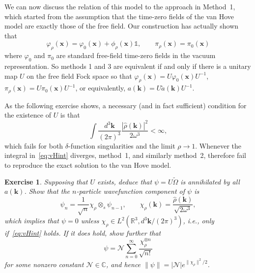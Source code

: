 \documentclass[12pt,a4paper]{article}
\newcommand{\1}{\mathds{1}}                         %
\newcommand{\RR}{\mathbb{R}}           %
\newcommand{\CC}{\mathbb{C}}           %
\newcommand{\kb}{{\boldsymbol{k}}}
\newcommand{\xb}{{\boldsymbol{x}}}
\newtheorem{exercise}[theorem]{Exercise}
\begin{document}
	We can now discuss the relation of this model to the approach in Method~1,
	which started from the assumption that the time-zero fields of the van Hove model are exactly those of the free field. Our construction has actually shown that
	\begin{equation}
	\varphi_\rho(\xb) = \varphi_0(\xb) + \phi_\rho(\xb)\mathbb{1}, \qquad\pi_\rho(\xb) =
	\pi_0(\xb) 
	\end{equation}
	where $\varphi_0$ and $\pi_0$ are standard free-field time-zero fields in the vacuum representation. So methods 1 and 3 are equivalent if and only if there is a unitary
	map $U$ on the free field Fock space so that $\varphi_\rho(\xb)=U\varphi_0(\xb)U^{-1}$, $\pi_\rho(\xb)=U\pi_0(\xb)U^{-1}$, 
	or equivalently, $a(\kb)  = U \tilde{a}(\kb) U^{-1}$.
	
	As the following exercise shows, a necessary (and in fact sufficient) condition for the existence of $U$ is that 
	\begin{equation}\label{eq:vHint}
	\int \frac{d^3\kb}{(2\pi)^3} \frac{|\hat{\rho}(\kb)|^2}{2\omega^3} <\infty,
	\end{equation}
	which fails for both $\delta$-function singularities and the limit $\rho\to 1$.  Whenever the integral in~\eqref{eq:vHint} diverges, method~1, and similarly method~2, therefore fail to reproduce the exact solution to the van Hove model.
	
	\begin{exercise}
		Supposing that $U$ exists, deduce that $\psi = U\tilde{\Omega}$ is annihilated by all $a(\kb)$. Show that the $n$-particle wavefunction component of $\psi$ is
		\[
		\psi_n = \frac{1}{\sqrt{n}}\chi_\rho\otimes_s \psi_{n-1},\qquad \chi_\rho(\kb)= \frac{\hat{\rho}(\kb)}{\sqrt{2\omega^3}},
		\]
		which implies that $\psi=0$ unless $\chi_\rho\in L^2(\RR^3,d^3\kb/(2\pi)^3)$, i.e., only if~\eqref{eq:vHint} holds. If it does hold, show further that
		\[
		\psi = \mathcal{N} \sum_{n=0}^\infty \frac{\chi_\rho^{\otimes n}}{\sqrt{n!}}
		\]
		for some nonzero constant $\mathcal{N}\in\CC$,
		and hence $\|\psi\| = |\mathcal{N}| e^{\|\chi_\rho\|^2/2}$. 
	\end{exercise}
	
\end{document}
